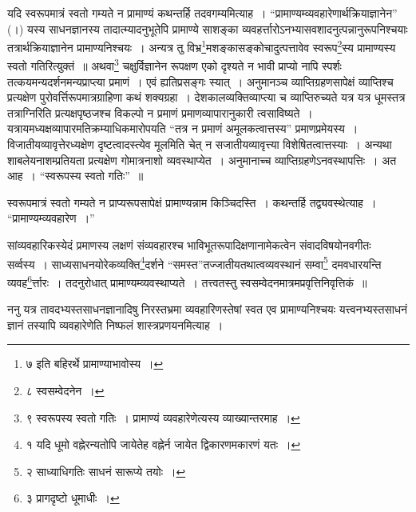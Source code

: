 \documentclass[article,12pt,a4paper]{memoir}
\begin{document}
	  \pstart यदि स्वरूपमात्रं स्वतो गम्यते न प्रामाण्यं कथन्तर्हि तदवगम्यमित्याह । {\color{DodgerBlue3}“प्रामाण्यम्व्यवहारेणार्थक्रियाज्ञानेन”} (।) यस्य साधनज्ञानस्य तादात्म्यादनुभूतेपि प्रामाण्ये साशङ्का व्यवहर्त्तारोऽनभ्यासवशादनुत्पन्नानुरूपनिश्चयाः तत्रार्थक्रियाज्ञानेन प्रामाण्यनिश्चयः । अन्यत्र तु विभ्र\footnote{\label{pvv.6-7}  ७ इति बहिरर्थे प्रामाण्याभावोस्य ।}मशङ्कासङ्कोचादुत्पत्तावेव स्वरूप\footnote{\label{pvv.6-8}  ८ स्वसम्वेदनेन ।}स्य प्रामाण्यस्य स्वतो गतिरित्युक्तं ॥ अथवा\footnote{\label{pvv.6-9}  ९ स्वरूपस्य स्वतो गतिः । प्रामाण्यं व्यवहारेणेत्यस्य व्याख्यान्तरमाह ।} चक्षुर्विज्ञानेन रूपक्षण एको दृश्यते न भावी प्राप्यो नापि स्पर्शः तत्कयमन्यदर्शनमन्यप्राप्त्या प्रमाणं । एवं ह्यतिप्रसङ्गः स्यात् । \leavevmode{} अनुमानञ्च व्याप्तिग्रहणसापेक्षं व्याप्तिश्च प्रत्यक्षेण पुरोवर्त्तिरूपमात्रग्राहिणा कथं शक्यग्रहा । देशकालव्यक्तिव्याप्त्या च व्याप्तिरुच्यते यत्र यत्र धूमस्तत्र तत्राग्नि\leavevmode{}रिति प्रत्यक्षपृष्ठजश्च विकल्पो न प्रमाणं प्रमाणव्यापारानुकारी त्वसाविष्यते । यत्रायमध्यक्षव्यापारमतिक्रम्याधिकमारोपयति {\color{DodgerBlue3}“तत्र न प्रमाणं अमूलकत्वात्तस्य”} प्रमाणप्रमेयस्य । विजातीयव्यावृत्तेरध्यक्षेण दृष्टत्वादस्त्येव मूलमिति चेत् न सजातीयव्यावृत्त्या विशेषितत्वात्तस्याः । अन्यथा शाबलेयनाशम्प्रतियता प्रत्यक्षेण गोमात्रनाशो व्यवस्थाप्येत । अनुमानाच्च व्याप्तिग्रहणेऽनवस्थापत्तिः । अत आह । {\color{DodgerBlue3}“स्वरूपस्य स्वतो गतिः”} ॥
	\pend
      

	  \pstart स्वरूपमात्रं स्वतो गम्यते न प्राप्यरूपसापेक्षं प्रामाण्यन्नाम किञ्चिदस्ति । कथन्तर्हि तद्व्यवस्थेत्याह । {\color{DodgerBlue3}“प्रामाण्यम्व्यवहारेण ।”}
	\pend
      

	  \pstart सांव्यवहारिकस्येदं प्रमाणस्य लक्षणं संव्यवहारश्च भाविभूतरूपादिक्षणानामेकत्वेन संवादविषयोनवगीतः सर्व्वस्य । साध्यसाधनयोरेकव्यक्ति\footnote{\label{pvv.7-1}  १ यदि धूमो वह्नेरन्यतोपि जायेतेह वह्नेर्न जायेत द्विकारणमकारणं यतः ।}दर्शने {\color{DodgerBlue3}“समस्त”}तज्जातीयतथात्वव्यवस्थानं सम्वा\footnote{\label{pvv.7-2}  २ साध्याधिगतिः साधनं सारूप्ये तयोः ।} दमवधारयन्ति व्यवह\footnote{\label{pvv.7-3}  ३ प्रागदृष्टो धूमाधीः ।}र्त्तारः । तदनुरोधात् प्रामाण्यम्व्यवस्थाप्यते । तत्त्वतस्तु स्वसम्वेदनमात्रमप्रवृत्तिनिवृत्तिकं ॥
	\pend
      

	  \pstart ननु यत्र तावदभ्यस्तसाधनज्ञानादिषु निरस्तभ्रमा व्यवहारिणस्तेषां स्वत एव प्रामाण्यनिश्चयः यत्त्वनभ्यस्तसाधनं ज्ञानं तस्यापि व्यवहारेणेति निष्फलं शास्त्रप्रणयनमित्याह ।
	\pend
      
\end{document}
